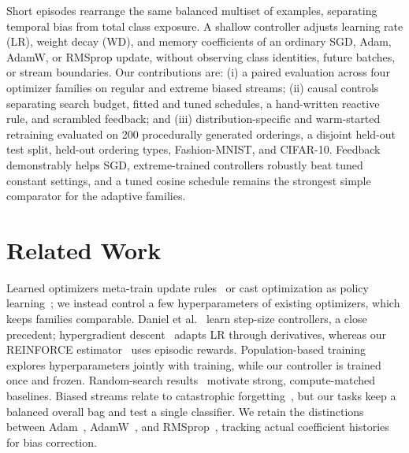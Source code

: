 \documentclass{article}
\begin{document}
Short episodes rearrange the same balanced multiset of examples, separating temporal bias from total class exposure. A shallow controller adjusts learning rate (LR), weight decay (WD), and memory coefficients of an ordinary SGD, Adam, AdamW, or RMSprop update, without observing class identities, future batches, or stream boundaries. Our contributions are: (i) a paired evaluation across four optimizer families on regular and extreme biased streams; (ii) causal controls separating search budget, fitted and tuned schedules, a hand-written reactive rule, and scrambled feedback; and (iii) distribution-specific and warm-started retraining evaluated on 200 procedurally generated orderings, a disjoint held-out test split, held-out ordering types, Fashion-MNIST, and CIFAR-10. Feedback demonstrably helps SGD, extreme-trained controllers robustly beat tuned constant settings, and a tuned cosine schedule remains the strongest simple comparator for the adaptive families.

\section{Related Work}
Learned optimizers meta-train update rules~\cite{andrychowicz2016} or cast optimization as policy learning~\cite{limalik2017}; we instead control a few hyperparameters of existing optimizers, which keeps families comparable. Daniel et al.~\cite{daniel2016} learn step-size controllers, a close precedent; hypergradient descent~\cite{baydin2018} adapts LR through derivatives, whereas our REINFORCE estimator~\cite{williams1992} uses episodic rewards. Population-based training~\cite{jaderberg2017} explores hyperparameters jointly with training, while our controller is trained once and frozen. Random-search results~\cite{bergstra2012} motivate strong, compute-matched baselines. Biased streams relate to catastrophic forgetting~\cite{kirkpatrick2017}, but our tasks keep a balanced overall bag and test a single classifier. We retain the distinctions between Adam~\cite{kingma2015}, AdamW~\cite{loshchilov2019}, and RMSprop~\cite{tieleman2012}, tracking actual coefficient histories for bias correction.
\end{document}
